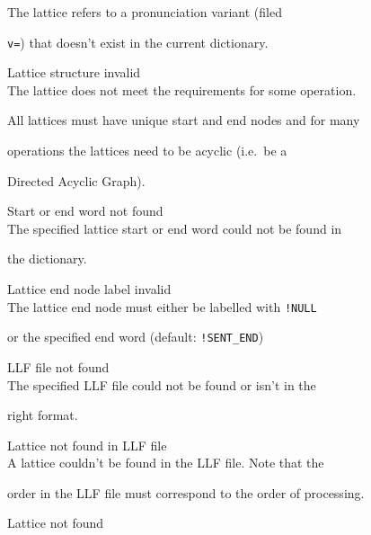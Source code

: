\begin{itemize}
\begin{itemize}
        The lattice refers to a pronunciation variant (filed


        \texttt{v=}) that doesn't exist in the current dictionary.





    Lattice structure invalid\\


        The lattice does not meet the requirements for some operation.


        All lattices must have unique start and end nodes and for many


        operations the lattices need to be acyclic (i.e.\ be a


        Directed Acyclic Graph).





    Start or end word not found\\


        The specified lattice start or end word could not be found in


        the dictionary.





    Lattice end node label invalid\\


        The lattice end node must either be labelled with \verb|!NULL|


        or the specified end word (default: \verb|!SENT_END|)





    LLF file not found\\


        The specified LLF file could not be found or isn't in the


        right format.





    Lattice not found in LLF file\\


        A lattice couldn't be found in the LLF file. Note that the


        order in the LLF file must correspond to the order of processing.





    Lattice not found\\



\end{itemize}
\end{itemize}
